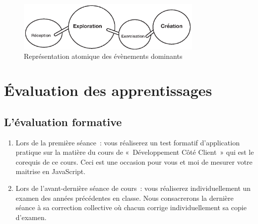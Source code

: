 \begin{figure}[H]
    \begin{center}
        \includegraphics[width=0.8\textwidth]{figures/EAEs.eps}
        \caption{Représentation atomique des évènements dominants \cite{leclercq2008modele}}
    \end{center}
\end{figure}
\clearpage

\section{Évaluation des apprentissages}
\subsection{L’évaluation formative}
\label{eval_formative}
\begin{enumerate}
    \item Lors de la première séance~: vous réaliserez un test formatif d’application pratique sur la matière du cours de «~Développement Côté Client~» qui est le corequis de ce cours. Ceci est une occasion pour vous et moi de mesurer votre maitrise en JavaScript.
    \item Lors de l'avant-dernière séance de cours~: vous réaliserez individuellement un examen des années précédentes en classe. Nous consacrerons la dernière séance à sa correction collective où chacun corrige individuellement sa copie d'examen.
\end{enumerate}

